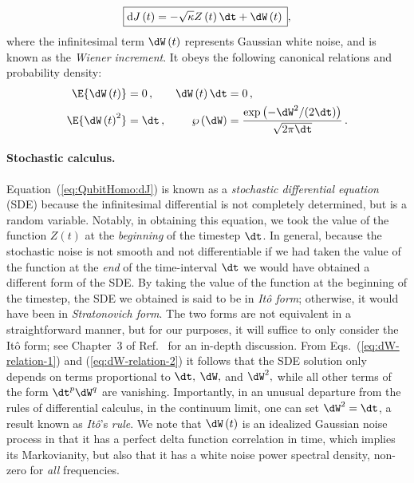 \begin{equation}
\boxed{\mathrm{d}J\left(t\right)=-\sqrt{\kappa}Z\left(t\right)\dt+\dW\left(t\right)\,},\label{eq:QubitHomo:dJ}
\end{equation}
where the infinitesimal term $\dW\left(t\right)$ represents Gaussian
white noise, and is known as the \emph{Wiener increment}. It obeys
the following canonical relations and probability density: 
\begin{align}
\E{\dW\left(t\right)} & =0\,, & \dW\left(t\right)\dt & =0\,,\label{eq:dW-relation-1}\\
\E{\dW\left(t\right)^{2}} & =\dt\,, & \wp\left(\dW\right) & =\frac{\exp\left(-\dW^{2}/(2\dt)\right)}{\sqrt{2\pi\dt}}\,.\label{eq:dW-relation-2}
\end{align}


\paragraph{Stochastic calculus. }

Equation~(\ref{eq:QubitHomo:dJ}) is known as a\emph{ stochastic
differential equation} (SDE) because the infinitesimal differential
is not completely determined, but is a random variable. Notably, in
obtaining this equation, we took the value of the function $Z\left(t\right)$
at the \emph{beginning} of the timestep $\dt$. In general, because
the stochastic noise is not smooth and not differentiable if we had
taken the value of the function at the\emph{ end} of the time-interval
$\dt$ we would have obtained a different form of the SDE. By taking
the value of the function at the beginning of the timestep, the SDE
we obtained is said to be in \emph{Itô form}; otherwise, it would
have been in \emph{Stratonovich form}. The two forms are not equivalent
in a straightforward manner, but for our purposes, it will suffice
to only consider the Itô form; see Chapter~3 of Ref.~\citet{Jacobs2010Book}
for an in-depth discussion. From Eqs.~(\ref{eq:dW-relation-1}) and
(\ref{eq:dW-relation-2}) it follows that the SDE solution only depends
on terms proportional to $\dt,$ $\dW,$ and $\dW^{2},$ while all
other terms of the form $\dt^{p}\dW^{q}$ are vanishing. Importantly,
in an unusual departure from the rules of differential calculus, in
the continuum limit, one can set $\dW^{2}=\dt$, a result known as
\emph{Itô}'s \emph{rule}. We note that $\dW\left(t\right)$ is an
idealized Gaussian noise process in that it has a perfect delta function
correlation in time, which implies its Markovianity, but also that
it has a white noise power spectral density, non-zero for \emph{all}
frequencies.


